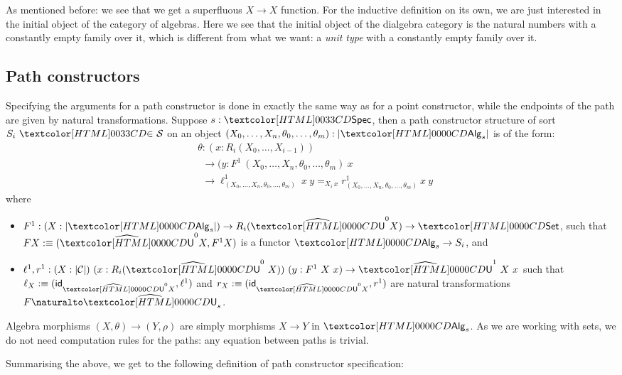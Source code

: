 \begin{remark}
  As mentioned before: we see that we get a superfluous $X \to X$
  function. For the inductive definition on its own, we are just
  interested in the initial object of the category of algebras. Here
  we see that the initial object of the dialgebra category is the
  natural numbers with a constantly empty family over it, which is
  different from what we want: a \emph{unit type} with a constantly
  empty family over it.
\end{remark}

\subsection{Path constructors}
\label{path-constructors}

Specifying the arguments for a path constructor is done in exactly the
same way as for a point constructor, while the endpoints of the path
are given by natural transformations. Suppose $s : \specty$, then a
path constructor structure of sort $\sortsin{S_i}{\Ss}$ on an object
$(X_0, \hdots, X_n, \theta_0,\hdots,\theta_m) : | \Alg_s |$ is of the
form:
\begin{align*}
  &\theta : (x : R_i (X_0, \hdots, X_{i-1})) \\
  &\ \ \to (y : F^1\ (X_0, \hdots, X_n, \theta_0, \hdots, \theta_m)\ x \\
  &\ \ \to \ell^1_{(X_0,\hdots,X_n,\theta_0,\hdots,\theta_m)}\ x\ y =_{X_i\ x} r^1_{(X_0,\hdots,X_n,\theta_0,\hdots,\theta_m)}\ x\ y 
\end{align*}
where
\begin{itemize}
\item $F^1 : (X : | \Alg_s |) \to R_i (\extendfunc{\Und}^0 X) \to \Set$, such
  that $F X \ddefeq (\extendfunc{\Und}^0 X, F^1 X)$ is a functor $\Alg_s \to S_i$, and
\item
  $\ell^1, r^1 : (X : | \Cc |)\ (x : R_i (\extendfunc{\Und}^0\ X))\ (y : F^1\ X\ x)
  \to \extendfunc{\Und}^1\ X\ x$
  such that $\ell_X \ddefeq (\id_{\extendfunc{\Und}^0 X}, \ell^1)$ and
  $r_X \ddefeq (\id_{\extendfunc{\Und}^0 X}, r^1)$ are natural transformations
  $\Nat{F}{\extendfunc{\Und}_s}$.
\end{itemize}
Algebra morphisms $(X,\theta) \to (Y,\rho)$ are simply morphisms
$X \to Y$ in $\Alg_s$. As we are working with sets, we do not need
computation rules for the paths: any equation between paths is
trivial.

Summarising the above, we get to the following definition of
path constructor specification:

